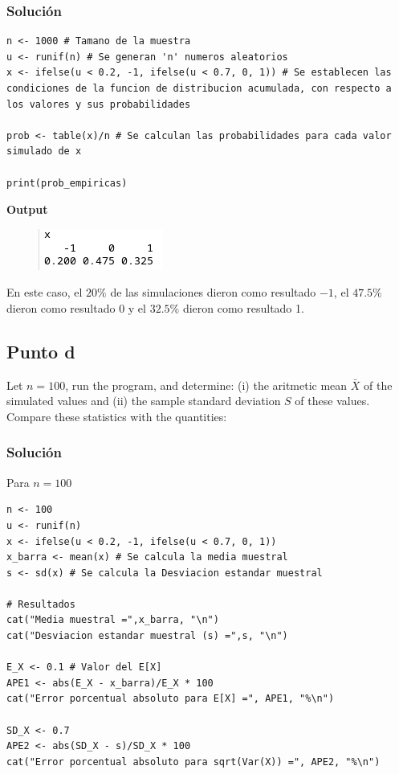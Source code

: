 \documentclass[12pt]{article}
\begin{document}
\subsubsection{Solución}


\begin{lstlisting}
n <- 1000 # Tamano de la muestra
u <- runif(n) # Se generan 'n' numeros aleatorios
x <- ifelse(u < 0.2, -1, ifelse(u < 0.7, 0, 1)) # Se establecen las condiciones de la funcion de distribucion acumulada, con respecto a los valores y sus probabilidades

prob <- table(x)/n # Se calculan las probabilidades para cada valor simulado de x

print(prob_empiricas)
\end{lstlisting}


\textbf{Output}


\begin{figure}[h]
    \centering
    \includegraphics[scale=0.5]{img/table_x.png}
\end{figure}

En este caso, el $20\%$ de las simulaciones dieron como resultado $-1$, el $47.5\%$ dieron como resultado 0 y el $32.5\%$ dieron como resultado 1.



\subsection{Punto d}

Let $n = 100$, run the program, and determine: (i) the aritmetic mean $\bar{X}$ of the simulated values and (ii) the sample standard deviation $S$ of these values. Compare these statistics with the quantities:

\subsubsection{Solución}

Para $n=100$


\begin{lstlisting}
n <- 100 
u <- runif(n)
x <- ifelse(u < 0.2, -1, ifelse(u < 0.7, 0, 1)) 
x_barra <- mean(x) # Se calcula la media muestral
s <- sd(x) # Se calcula la Desviacion estandar muestral

# Resultados
cat("Media muestral =",x_barra, "\n")
cat("Desviacion estandar muestral (s) =",s, "\n")

E_X <- 0.1 # Valor del E[X]
APE1 <- abs(E_X - x_barra)/E_X * 100
cat("Error porcentual absoluto para E[X] =", APE1, "%\n")

SD_X <- 0.7
APE2 <- abs(SD_X - s)/SD_X * 100
cat("Error porcentual absoluto para sqrt(Var(X)) =", APE2, "%\n")
\end{lstlisting}
\end{document}
